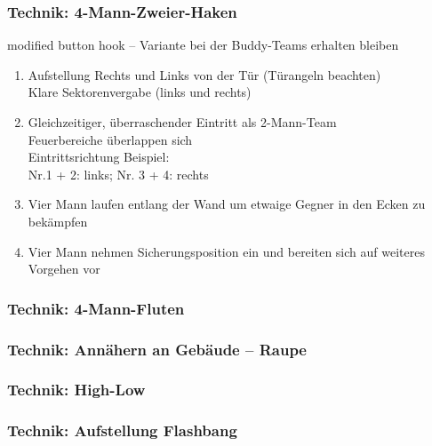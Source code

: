 \subsubsection{Technik: 4-Mann-Zweier-Haken}
\begin{center}
	modified button hook -- Variante bei der Buddy-Teams erhalten bleiben
\end{center}
	\begin{enumerate}
		\item Aufstellung Rechts und Links von der Tür (Türangeln beachten) \\
		Klare Sektorenvergabe (links und rechts)
		\item Gleichzeitiger, überraschender Eintritt als 2-Mann-Team \\
		Feuerbereiche überlappen sich \\
		Eintrittsrichtung Beispiel: \\
		Nr.1 + 2: links; Nr. 3 + 4: rechts
		\item Vier Mann laufen entlang der Wand um etwaige Gegner in den Ecken zu bekämpfen
		\item Vier Mann nehmen Sicherungsposition ein und bereiten sich auf weiteres Vorgehen vor
	\end{enumerate}      
\subsubsection{Technik: 4-Mann-Fluten}
\subsubsection{Technik: Annähern an Gebäude -- Raupe}
\subsubsection{Technik: High-Low}
\subsubsection{Technik: Aufstellung Flashbang}